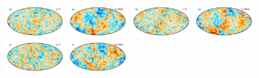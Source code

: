 \documentclass[twocolumn]{../../common/aa}
\begin{document}

\begin{figure}

	\centering
	\includegraphics[width=0.24\textwidth]{figures/Q_deltaQ.pdf}
	\includegraphics[width=0.24\textwidth]{figures/Q_W_deltaQ.pdf}
	\includegraphics[width=0.24\textwidth]{figures/Q_deltaU.pdf}
	\includegraphics[width=0.24\textwidth]{figures/Q_W_deltaU.pdf}\\
	\includegraphics[width=0.24\textwidth]{figures/V_deltaQ.pdf}
	\includegraphics[width=0.24\textwidth]{figures/V_W_deltaQ.pdf}

\end{figure}
\end{document}
